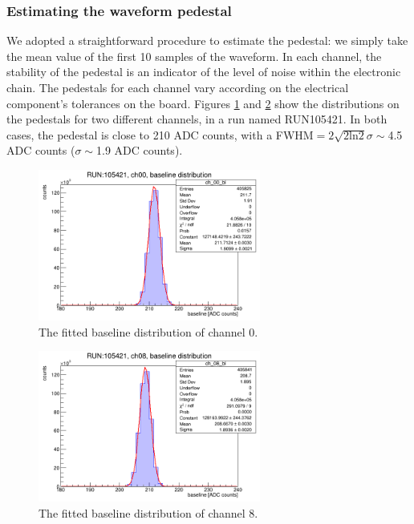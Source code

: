 \subsubsection{Estimating the waveform pedestal}\label{basel}
We adopted a straightforward procedure to estimate the pedestal: 
we simply take the mean value of the first 10 samples of the waveform. 
In each channel, the stability of the pedestal is an indicator of the 
level of noise within the electronic chain. 
The pedestals for each channel vary according on the electrical component's 
tolerances on the board.
Figures \ref{fig:baseline1} and \ref{fig:baseline2} show the distributions on 
the pedestals for two different channels, in a run named RUN105421.
In both cases, the pedestal is close to 210 ADC counts, with a 
FWHM$=2 \sqrt{2 \text{ln}2}\sigma\sim$4.5 ADC counts ($\sigma \sim$1.9 ADC counts).
  \begin{figure}[!h]
      \centering
      \includegraphics[width=0.65\textwidth]{figures/png/baseline_ch00.png}
      \caption{The fitted baseline distribution of channel 0.}
      \label{fig:baseline1}
  \end{figure}
  \begin{figure}[!h]
      \centering
      \includegraphics[width=0.65\textwidth]{figures/png/baseline_ch08.png}
      \caption{The fitted baseline distribution of channel 8.}
      \label{fig:baseline2}
\end{figure}

